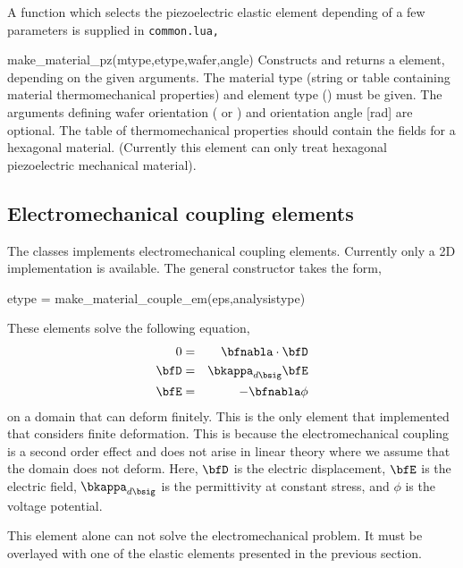 A function which selects the piezoelectric elastic element depending of a 
few parameters is supplied in \tt{common.lua},
\begin{codelist}
  \item[make\_material\_pz(mtype,etype,wafer,angle)]
    Constructs and returns a  element, depending on the
    given arguments. The material type  (string or table containing
    material thermomechanical properties) and element type
    () must be given. 
    The arguments defining wafer orientation ( or
    ) and orientation angle  [rad] are optional.
    The table of thermomechanical properties  should contain the 
    fields  for a 
    hexagonal material.
    (Currently this element can only treat hexagonal piezoelectric mechanical
     material).
\end{codelist}

\clearpage
\subsection{Electromechanical coupling elements}
The  classes implements electromechanical
coupling elements. Currently only a 2D implementation is available.
The general constructor takes the form,
\begin{codelist}
  \item[etype = make\_material\_couple\_em(eps,analysistype)]
\end{codelist}
These elements solve the following equation,
\begin{eqnarray}
0
&=& \bfnabla\cdot\bfD \\
\bfD  &=& \bkappa_{d\bsig}\bfE \\
\bfE  &=&-\bfnabla\phi
\end{eqnarray}
on a domain that can deform finitely. This is the only element that
implemented that considers finite deformation. This is because
the electromechanical coupling is a second order effect and does
not arise in linear theory where we assume that the domain does not
deform.
Here, $\bfD$ is the electric displacement, $\bfE$ is the electric field,
$\bkappa_{d\bsig}$ is the permittivity at constant stress, and 
$\phi$ is the voltage potential.

This element alone can not solve the electromechanical problem. It must
be overlayed with one of the elastic elements presented in the previous
section. 

